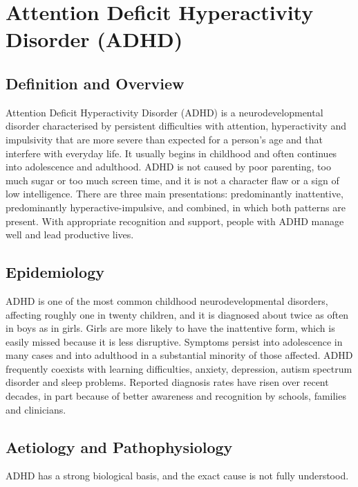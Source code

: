 \chapter{Attention Deficit Hyperactivity Disorder (ADHD)}

\section*{Definition and Overview}
Attention Deficit Hyperactivity Disorder (ADHD) is a neurodevelopmental disorder characterised by persistent difficulties with attention, hyperactivity and impulsivity that are more severe than expected for a person's age and that interfere with everyday life. It usually begins in childhood and often continues into adolescence and adulthood. ADHD is not caused by poor parenting, too much sugar or too much screen time, and it is not a character flaw or a sign of low intelligence. There are three main presentations: predominantly inattentive, predominantly hyperactive-impulsive, and combined, in which both patterns are present. With appropriate recognition and support, people with ADHD manage well and lead productive lives.

\section*{Epidemiology}
ADHD is one of the most common childhood neurodevelopmental disorders, affecting roughly one in twenty children, and it is diagnosed about twice as often in boys as in girls. Girls are more likely to have the inattentive form, which is easily missed because it is less disruptive. Symptoms persist into adolescence in many cases and into adulthood in a substantial minority of those affected. ADHD frequently coexists with learning difficulties, anxiety, depression, autism spectrum disorder and sleep problems. Reported diagnosis rates have risen over recent decades, in part because of better awareness and recognition by schools, families and clinicians.

\section*{Aetiology and Pathophysiology}
ADHD has a strong biological basis, and the exact cause is not fully understood.

